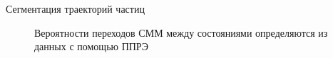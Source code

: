 \documentclass{beamer}
\begin{document}
\begin{frame}{Сегментация траекторий частиц}
    \begin{figure}
        \caption{Вероятности переходов СММ между состояниями
        определяются из данных с помощью ППРЭ}
    \end{figure}
\end{frame}
\end{document}
